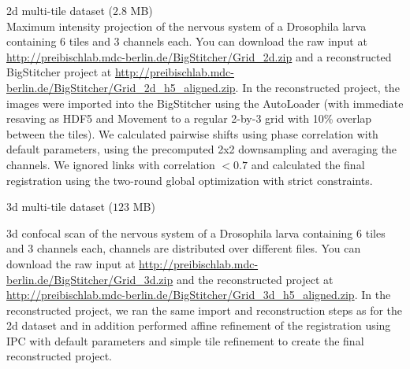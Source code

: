 \documentclass[]{spie}  %
\begin{document}
\begin{description}
\item 2d multi-tile dataset ($2.8$ MB) \\
Maximum intensity projection of the nervous system of a Drosophila larva containing 6 tiles and 3 channels each. You can download the raw input at \url{http://preibischlab.mdc-berlin.de/BigStitcher/Grid_2d.zip} and a reconstructed BigStitcher project at \url{http://preibischlab.mdc-berlin.de/BigStitcher/Grid_2d_h5_aligned.zip}. In the reconstructed project, the images were imported into the BigStitcher using the AutoLoader (with immediate resaving as HDF5 and Movement to a regular 2-by-3 grid with 10\% overlap between the tiles). We calculated pairwise shifts using phase correlation with default parameters, using the precomputed 2x2 downsampling and averaging the channels. We ignored links with correlation $<0.7$ and calculated the final registration using the two-round global optimization with strict constraints. 
\item 3d multi-tile dataset ($123$ MB)
\begin{sloppypar} %
3d confocal scan of the nervous system of a Drosophila larva containing 6 tiles and 3 channels each, channels are distributed over different files. You can download the raw input at \url{http://preibischlab.mdc-berlin.de/BigStitcher/Grid_3d.zip} and the reconstructed project at \url{http://preibischlab.mdc-berlin.de/BigStitcher/Grid_3d_h5_aligned.zip}. In the reconstructed project, we ran the same import and reconstruction steps as for the 2d dataset and in addition performed affine refinement of the registration using IPC with default parameters and simple tile refinement to create the final reconstructed project.
\end{sloppypar}

\end{description}
\end{document}
